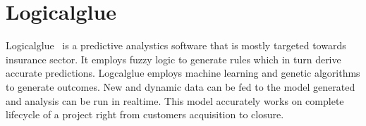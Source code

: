 \section{Logicalglue}

Logicalglue~\cite{hid-sp18-413-Logicalglue} is a predictive analystics software
that is mostly targeted towards insurance sector. It employs fuzzy logic to
generate rules which in turn derive accurate predictions. Logcalglue employs
machine learning and genetic algorithms to generate outcomes. New and dynamic
data can be fed to the model generated and analysis can be run in realtime. This
model accurately works on complete lifecycle of a project right from customers
acquisition to closure.
